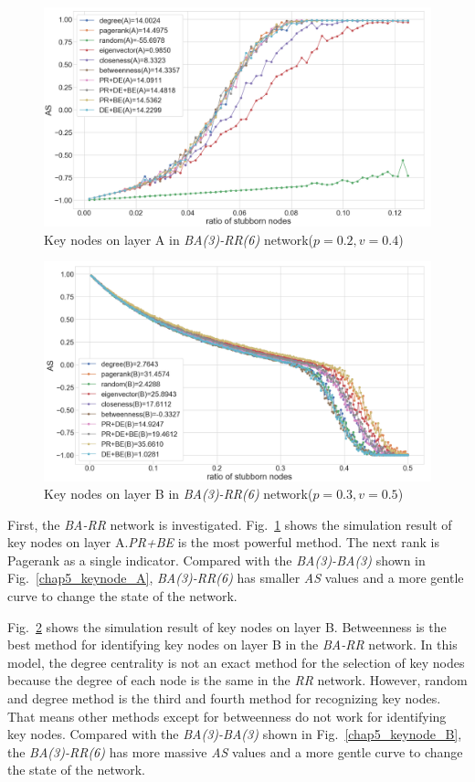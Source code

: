 \begin{figure}[!htb]
	\centering
	\includegraphics[width=\hsize]{figure/chap5_keynode_BA_RR_A.png}
	\caption{Key nodes on layer A in \textit{BA(3)-RR(6)} network($p=0.2, v=0.4$)}
	\label{chap5_keynode_BA_RR_A}
\end{figure}
\begin{figure}[!htb]
	\centering
	\includegraphics[width=\hsize]{figure/chap5_keynode_BA_RR_B.png}
	\caption{Key nodes on layer B in \textit{BA(3)-RR(6)} network($p=0.3, v=0.5$)}
	\label{chap5_keynode_BA_RR_B}
\end{figure}

First, the \textit{BA-RR} network is investigated. Fig.~\ref{chap5_keynode_BA_RR_A} shows the simulation result of key nodes on layer A.\textit{PR+BE} is the most powerful method. The next rank is Pagerank as a single indicator. Compared with the \textit{BA(3)-BA(3)} shown in Fig.~\ref{chap5_keynode_A}, \textit{BA(3)-RR(6)} has smaller \textit{AS} values and a more gentle curve to change the state of the network. 

Fig.~\ref{chap5_keynode_BA_RR_B} shows the simulation result of key nodes on layer B. Betweenness is the best method for identifying key nodes on layer B in the \textit{BA-RR} network. In this model, the degree centrality is not an exact method for the selection of key nodes because the degree of each node is the same in the \textit{RR} network. However, random and degree method is the third and fourth method for recognizing key nodes. That means other methods except for betweenness do not work for identifying key nodes. Compared with the \textit{BA(3)-BA(3)} shown in Fig.~\ref{chap5_keynode_B}, the \textit{BA(3)-RR(6)} has more massive \textit{AS} values and a more gentle curve to change the state of the network. 

